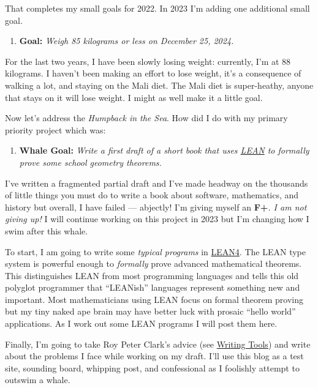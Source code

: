 That completes my small goals for 2022. In 2023 I'm adding one
additional small goal.

\begin{enumerate}
\def\labelenumi{\arabic{enumi}.}
\setcounter{enumi}{5}
\item
  \textbf{Goal:} \emph{Weigh 85 kilograms or less on December 25, 2024.}
\end{enumerate}

For the last two years, I have been slowly losing weight: currently, I'm
at 88 kilograms. I haven't been making an effort to lose weight, it's a
consequence of walking a lot, and staying on the Mali diet. The Mali
diet is super-heathy, anyone that stays on it will lose weight. I might
as well make it a little goal.

Now let's address the \emph{Humpback in the Sea}. How did I do with my
primary priority project which was:

\begin{enumerate}
\def\labelenumi{\arabic{enumi}.}
\setcounter{enumi}{6}
\item
  \textbf{Whale Goal:} \emph{Write a first draft of a short book that
  uses \href{https://leanprover-community.github.io/}{LEAN} to formally
  prove some school geometry theorems.}
\end{enumerate}

I've written a fragmented partial draft and I've made headway on the
thousands of little things you must do to write a book about software,
mathematics, and history but overall, I have failed --- abjectly! I'm
giving myself an \textbf{F+}\emph{. I am not giving up!} I will continue
working on this project in 2023 but I'm changing how I swim after this
whale.

To start, I am going to write some \emph{typical programs} in
\href{https://github.com/leanprover/lean4}{LEAN4}. The LEAN type system
is powerful enough to \emph{formally} prove advanced mathematical
theorems. This distinguishes LEAN from most programming languages and
tells this old polyglot programmer that ``LEANish'' languages represent
something new and important. Most mathematicians using LEAN focus on
formal theorem proving but my tiny naked ape brain may have better luck
with prosaic ``hello world'' applications. As I work out some LEAN
programs I will post them here.

Finally, I'm going to take Roy Peter Clark's advice (see
\href{https://www.amazon.com/Writing-Tools-Essential-Strategies-Writer-ebook/dp/B000SEIW9E}{Writing
Tools}) and write about the problems I face while working on my draft.
I'll use this blog as a test site, sounding board, whipping post, and
confessional as I foolishly attempt to outswim a whale.

